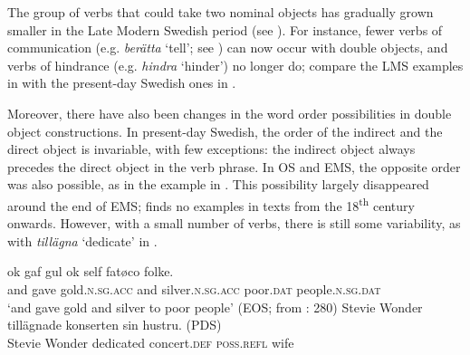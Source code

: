 \documentclass[output=paper]{langscibook}
\begin{document}
The group of verbs that could take two nominal objects has gradually grown smaller in the Late Modern Swedish period (see \citealt{Valdeson2017}). For instance, fewer verbs of communication (e.g. \textit{berätta} ‘tell’; see \citealt{Silen2005}) can now occur with double objects, and verbs of hindrance (e.g. \textit{hindra} ‘hinder’) no longer do; compare the LMS examples in  with the present-day Swedish ones in .


\ea\label{ex:intro:24}

\z
\ex \label{ex:intro:25}

\z
\z

Moreover, there have also been changes in the word order possibilities in double object constructions. In present-day Swedish, the order of the indirect and the direct object is invariable, with few exceptions: the indirect object always precedes the direct object in the verb phrase. In OS and EMS, the opposite order was also possible, as in the example in . This possibility largely disappeared around the end of EMS; \citet{Valdeson2016} finds no examples in texts from the 18\textsuperscript{th} century onwards. However, with a small number of verbs, there is still some variability, as with \textit{tillägna} ‘dedicate’ in .


\ea\label{ex:intro:26}
\gll  ok   gaf   gul             ok   self           fatøco     folke. \\
  and gave   gold\textsc{.n.sg.acc}   and  silver\textsc{.n.sg.acc}   poor\textsc{.dat}   people\textsc{.n.sg.dat}\\
    \glt `and gave gold and silver to poor people’ (EOS; from \citealt{Valdeson2016}: 280)
\ex\label{ex:intro:27}
\ea
\gll  Stevie Wonder   tillägnade konserten     sin         hustru. (PDS)\\
Stevie Wonder  dedicated  concert.\textsc{def}     \textsc{poss.refl}  wife  \\
\end{document}
